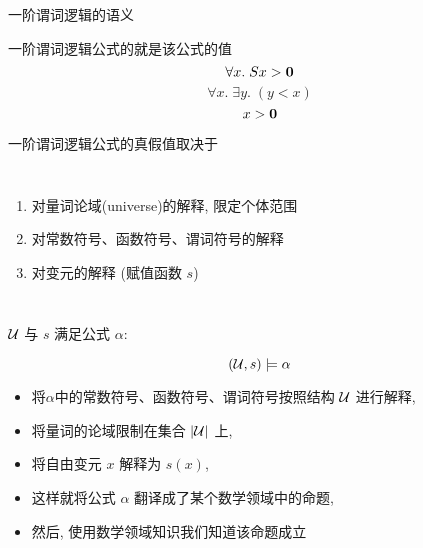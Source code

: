 
\begin{frame}{}
  \begin{center}
    一阶谓词逻辑的语义

  \end{center}
\end{frame}

\begin{frame}{}
  \begin{center}
    一阶谓词逻辑公式的就是该公式的值
    \[
      \forall x.\; Sx > {\bf 0}
    \]
    \[
      \forall x.\; \exists y.\; (y < x)
    \]
    \[
      x > {\bf 0}
    \]

    \pause
    \vspace{0.60cm}
    一阶谓词逻辑公式的真假值取决于
    \begin{columns}
        \begin{enumerate}[(1)]
          \setlength{\itemsep}{6pt}
          \item 对量词论域(universe)的解释, 限定个体范围
          \item 对常数符号、函数符号、谓词符号的解释
          \item 对变元的解释 (赋值函数 $s$)
        \end{enumerate}
    \end{columns}

    \pause
    \vspace{0.60cm}
  \end{center}
\end{frame}

\begin{frame}{}
  \begin{definition}
    \begin{center}
      $\mathcal{U}$ 与 $s$ 满足公式 $\alpha$:
    \end{center}
    \[
      (\mathcal{U}, s) \models \alpha
    \]
    \begin{itemize}
      \setlength{\itemsep}{6pt}
      \item 将$\alpha$中的常数符号、函数符号、谓词符号按照结构 $\mathcal{U}$ 进行解释,
      \item 将量词的论域限制在集合 $|\mathcal{U}|$ 上,
      \item 将自由变元 $x$ 解释为 $s(x)$,
      \item 这样就将公式 $\alpha$ 翻译成了某个数学领域中的命题,
      \item 然后, 使用数学领域知识我们知道该命题成立
    \end{itemize}
  \end{definition}
\end{frame}

